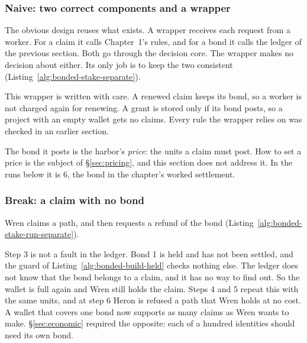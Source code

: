 \subsubsection{Naive: two correct components and a wrapper}

The obvious design reuses what exists. A wrapper receives each request
from a worker. For a claim it calls Chapter~1's rules, and for a bond it
calls the ledger of the previous section. Both go through the decision
core. The wrapper makes no decision about either. Its only job is to keep
the two consistent (Listing~\ref{alg:bonded-stake-separate}).


This wrapper is written with care. A renewed claim keeps its bond, so a
worker is not charged again for renewing. A grant is stored only if its
bond posts, so a project with an empty wallet gets no claims. Every rule
the wrapper relies on was checked in an earlier section.

The bond it posts is the harbor's \emph{price}: the units a claim must
post. How to set a price is the subject of \S\ref{sec:pricing}, and this
section does not address it. In the runs below it is 6, the bond in the
chapter's worked settlement.

\subsubsection{Break: a claim with no bond}

Wren claims a path, and then requests a refund of the bond
(Listing~\ref{alg:bonded-stake-run-separate}).


Step 3 is not a fault in the ledger. Bond 1 is held and has not been
settled, and the guard of Listing~\ref{alg:bonded-build-held} checks
nothing else. The ledger does not know that the bond belongs to a claim,
and it has no way to find out. So the wallet is full again and Wren still
holds the claim. Steps 4 and 5 repeat this with the same units, and at
step 6 Heron is refused a path that Wren holds at no cost. A wallet that
covers one bond now supports as many claims as Wren wants to make.
\S\ref{sec:economic} required the opposite: each of a hundred identities
should need its own bond.

